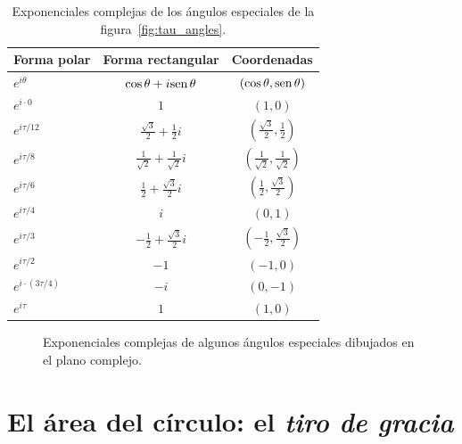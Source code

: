 \begin{table}
\begin{center}
\begin{tabular}{lcc}
Forma polar & Forma rectangular & Coordenadas \\ \hline\hline
$e^{i\theta}$ & $\cos\theta + i\mbox{sen}\,\theta$ & $(\cos\theta, \mbox{sen}\,\theta)$ \\ \hline
$e^{i\cdot0}$ & $1$ & $(1, 0)$ \smallskip \\
$e^{i\tau/12}$ & $\frac{\sqrt{3}}{2} + \frac{1}{2}i$ & $(\frac{\sqrt{3}}{2}, \frac{1}{2})$ \smallskip \\
$e^{i\tau/8}$ & $\frac{1}{\sqrt{2}} +  \frac{1}{\sqrt{2}}i$ & $(\frac{1}{\sqrt{2}}, \frac{1}{\sqrt{2}})$ \smallskip \\
$e^{i\tau/6}$ & $\frac{1}{2} +\frac{\sqrt{3}}{2} i$ & $(\frac{1}{2}, \frac{\sqrt{3}}{2})$ \smallskip \\
$e^{i\tau/4}$ & $i$ & $(0, 1)$ \smallskip \\
$e^{i\tau/3}$ & $-\frac{1}{2} +\frac{\sqrt{3}}{2} i$ & $(-\frac{1}{2}, \frac{\sqrt{3}}{2})$ \smallskip \\
$e^{i\tau/2}$ & $-1$ & $(-1, 0)$ \smallskip \\
$e^{i\cdot(3\tau/4)}$ & $-i$ & $(0, -1)$ \smallskip \\
$e^{i\tau}$ & $1$ & $(1, 0)$
\end{tabular}
\end{center}
\caption{Exponenciales complejas de los ángulos especiales de la figura~\ref{fig:tau_angles}.\label{table:complex_exponentials}}
\end{table}

\begin{figure}
\begin{center}
\end{center}
\caption{Exponenciales complejas de algunos ángulos especiales dibujados en el plano complejo.\label{fig:tau_euler_circle}}
\end{figure}


\section{El área del círculo: el \emph{tiro de gracia}} %
\label{sec:circular_area}

